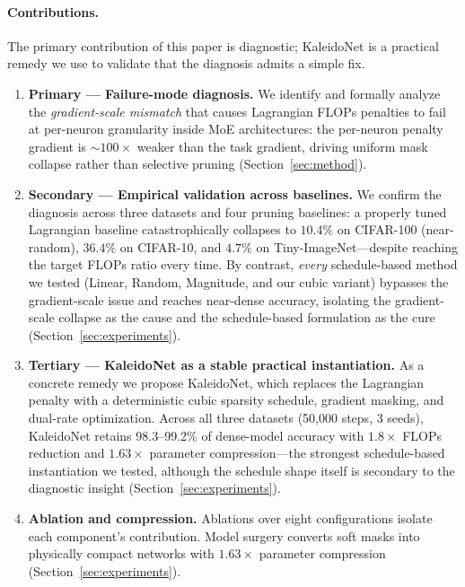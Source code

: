 \paragraph{Contributions.} The primary contribution of this paper is diagnostic; KaleidoNet is a practical remedy we use to validate that the diagnosis admits a simple fix.
\begin{enumerate}
    \item \textbf{Primary --- Failure-mode diagnosis.} We identify and formally analyze the \emph{gradient-scale mismatch} that causes Lagrangian FLOPs penalties to fail at per-neuron granularity inside MoE architectures: the per-neuron penalty gradient is ${\sim}100{\times}$ weaker than the task gradient, driving uniform mask collapse rather than selective pruning (Section~\ref{sec:method}).
    \item \textbf{Secondary --- Empirical validation across baselines.} We confirm the diagnosis across three datasets and four pruning baselines: a properly tuned Lagrangian baseline catastrophically collapses to $10.4\%$ on CIFAR-100 (near-random), $36.4\%$ on CIFAR-10, and $4.7\%$ on Tiny-ImageNet---despite reaching the target FLOPs ratio every time. By contrast, \emph{every} schedule-based method we tested (Linear, Random, Magnitude, and our cubic variant) bypasses the gradient-scale issue and reaches near-dense accuracy, isolating the gradient-scale collapse as the cause and the schedule-based formulation as the cure (Section~\ref{sec:experiments}).
    \item \textbf{Tertiary --- KaleidoNet as a stable practical instantiation.} As a concrete remedy we propose KaleidoNet, which replaces the Lagrangian penalty with a deterministic cubic sparsity schedule, gradient masking, and dual-rate optimization. Across all three datasets (50{,}000 steps, 3 seeds), KaleidoNet retains 98.3--99.2\% of dense-model accuracy with $1.8{\times}$ FLOPs reduction and $1.63{\times}$ parameter compression---the strongest schedule-based instantiation we tested, although the schedule shape itself is secondary to the diagnostic insight (Section~\ref{sec:experiments}).
    \item \textbf{Ablation and compression.} Ablations over eight configurations isolate each component's contribution. Model surgery converts soft masks into physically compact networks with $1.63{\times}$ parameter compression (Section~\ref{sec:experiments}).
\end{enumerate}
